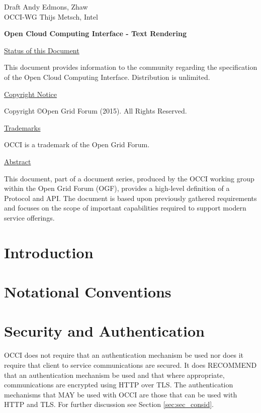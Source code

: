 \documentclass[10pt,a4paper]{article}
\begin{document}
\thispagestyle{empty}

Draft \hfill Andy Edmons, Zhaw \\
OCCI-WG \hfill Thijs Metsch, Intel\\
\rightline {\today}

\vspace*{0.5in}

\begin{Large}
\textbf{Open Cloud Computing Interface - Text Rendering}
\end{Large}

\vspace*{0.5in}

\underline{Status of this Document}

This document provides information to the community regarding the
specification of the Open Cloud Computing Interface. Distribution is
unlimited.

\underline{Copyright Notice}

Copyright \copyright Open Grid Forum (2015). All Rights Reserved.

\underline{Trademarks}

OCCI is a trademark of the Open Grid Forum.

\underline{Abstract}

This document, part of a document series, produced by the OCCI working
group within the Open Grid Forum (OGF), provides a high-level
definition of a Protocol and API. The document is based upon
previously gathered requirements and focuses on the scope of important
capabilities required to support modern service offerings.

\newpage
\tableofcontents
\newpage

\section{Introduction}


\section{Notational Conventions}


\section{Security and Authentication}
OCCI does not require that an authentication mechanism be used nor
does it require that client to service communications are secured. It
does RECOMMEND that an authentication mechanism be used and that where
appropriate, communications are encrypted using HTTP over TLS. The
authentication mechanisms that MAY be used with OCCI are those that
can be used with HTTP and TLS. For further discussion see Section
\ref{sec:sec_consid}.
\end{document}
